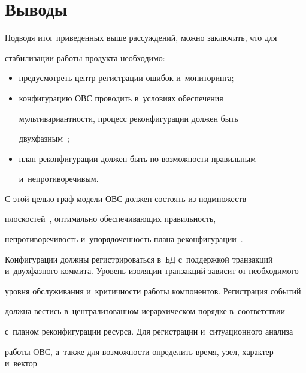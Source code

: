 \section{Выводы}


 


   Подводя итог приведенных выше рассуждений, можно заключить, что для 


стабилизации работы продукта необходимо: 





\pagebreak





\noindent


   \begin{itemize}


\item предусмотреть центр регистрации ошибок и~мониторинга;


\item конфигурацию ОВС проводить в~условиях обеспечения 


мультивариантности, процесс реконфигурации должен быть 


двухфазным~\cite{1-g7}; 


\item план реконфигурации должен быть по возможности правильным 


и~непротиворечивым.


\end{itemize}





   С этой целью граф модели ОВС должен состоять из подмножеств 


плоскостей~\cite{2-g7}, оптимально обеспечивающих правильность, 


непротиворечивость и~упорядоченность плана реконфигурации~\cite{1-g7}. 


Конфигурации должны регистрироваться в~БД с~поддержкой транзакций и~двухфазного коммита. Уровень изоляции транзакций зависит от необходимого 


уровня обслуживания и~кри\-тич\-ности работы компонентов. Регистрация событий 


долж\-на вестись в~централизованном иерархическом порядке в~соответствии 


с~планом реконфигурации ресурса. Для регистрации и~ситуационного анализа 


работы ОВС, а~также для возможности определить время, узел, характер и~вектор 


